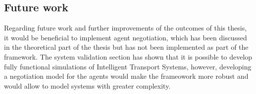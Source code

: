 \documentclass[main.tex]{subfiles}
\begin{document}
\subsection{Future work}

Regarding future work and further improvements of the outcomes of this thesis, it would be beneficial to implement agent negotiation, which 
has been discussed in the theoretical part of the thesis but has not been implemented as part of the framework. The system validation section 
has shown that it is possible to develop fully functional simulations of Intelligent Transport Systems, however, developing a negotiation model 
for the agents would make the frameowork more robust and would allow to model systems with greater complexity. 
\end{document}
